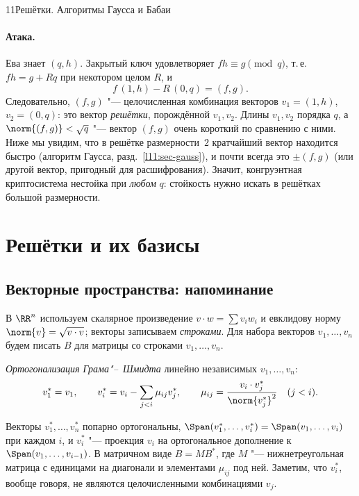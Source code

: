 \begin{lecture}{11}{Решётки. Алгоритмы Гаусса и Бабаи}
\paragraph{Атака.} Ева знает $(q, h)$. Закрытый ключ удовлетворяет $fh \equiv g \pmod q$, т.\,е.
$fh = g + Rq$ при некотором целом $R$, и
\[
  f\,(1, h) - R\,(0, q) = (f, g).
\]
Следовательно, $(f, g)$ "--- целочисленная комбинация векторов $v_1 = (1, h)$, $v_2 = (0, q)$:
это вектор \emph{решётки}, порождённой $v_1, v_2$. Длины $v_1, v_2$ порядка $q$, а
$\norm{(f, g)} < \sqrt{q}$ "--- вектор $(f, g)$ очень короткий по сравнению с ними. Ниже мы увидим, что в
решётке размерности~$2$ кратчайший вектор находится быстро (алгоритм Гаусса,
разд.~\ref{l11:sec-gauss}), и почти всегда это $\pm(f, g)$ (или другой вектор, пригодный
для расшифрования). Значит, конгруэнтная криптосистема нестойка при \emph{любом} $q$: стойкость
нужно искать в решётках большой размерности.


\section{Решётки и их базисы}

\subsection{Векторные пространства: напоминание}

В $\RR^n$ используем скалярное произведение $v \cdot w = \sum v_i w_i$ и евклидову норму
$\norm{v} = \sqrt{v \cdot v}$; векторы записываем \emph{строками}. Для набора векторов
$v_1, \dots, v_n$ будем писать $B$ для матрицы со строками $v_1, \dots, v_n$.

\begin{definition}
\emph{Ортогонализация Грама"--~Шмидта} линейно независимых $v_1, \dots, v_n$:
\[
  v_1^* = v_1, \qquad v_i^* = v_i - \sum_{j < i} \mu_{ij} v_j^*, \qquad
  \mu_{ij} = \frac{v_i \cdot v_j^*}{\norm{v_j^*}^2} \quad (j < i).
\]
\end{definition}

Векторы $v_1^*, \dots, v_n^*$ попарно ортогональны, $\Span(v_1^*, \dots, v_i^*) = \Span(v_1, \dots,
v_i)$ при каждом $i$, и $v_i^*$ "--- проекция $v_i$ на ортогональное дополнение к
$\Span(v_1, \dots, v_{i-1})$. В матричном виде $B = M B^*$, где $M$ "--- нижнетреугольная матрица с
единицами на диагонали и элементами $\mu_{ij}$ под ней. Заметим, что $v_i^*$, вообще говоря, не
являются целочисленными комбинациями $v_j$.


\end{lecture}
